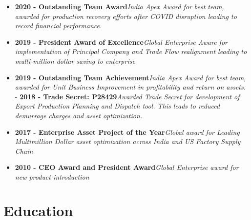 \documentclass[11pt, a4paper]{awesome-cv}
\begin{document}
\begin{itemize}
\item
  \hspace{5mm}

  \textbf{2020 - Outstanding Team Award}\newline\textit{India Apex Award for best team, awarded for production recovery efforts after COVID disruption leading to record financial performance.}
\item
  \hspace{5mm}

  \textbf{2019 - President Award of Excellence}\newline\textit{Global Enterprise Aware for implementation of Principal Company and Trade Flow realignment leading to multi-million dollar saving to enterprise}
\item
  \hspace{5mm}

  \textbf{2019 - Outstanding Team Achievement}\newline\textit{India Apex Award for best team, awarded for Unit Business Improvement in profitability and return on assets.}
  \newpage-
  \hspace{5mm}\textbf{2018 - Trade Secret: P28429}\newline\textit{Awarded Trade Secret for development of Export Production Planning and Dispatch tool. This leads to reduced demurrage charges and asset optimization.}
\item
  \hspace{5mm}

  \textbf{2017 - Enterprise Asset Project of the Year}\newline\textit{Global award for Leading Multimillion Dollar asset optimization across India and US Factory Supply Chain}
\item
  \hspace{5mm}

  \textbf{2010 - CEO Award and President Award}\newline\textit{Global Enterprise award for new product introduction}
\end{itemize}

\hypertarget{education}{%
\section{Education}\label{education}}
\end{document}
